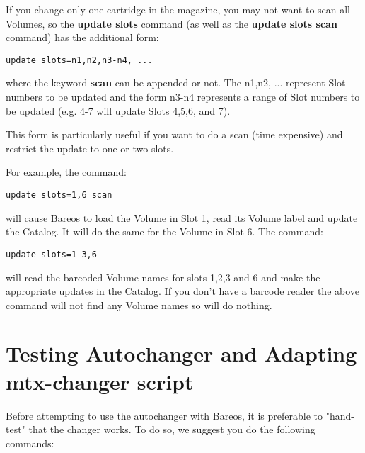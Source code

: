 If you change only one cartridge in the magazine, you may not want to scan all
Volumes, so the {\bf update slots} command (as well as the {\bf update slots
scan} command) has the additional form:

\footnotesize
\begin{verbatim}
update slots=n1,n2,n3-n4, ...
\end{verbatim}
\normalsize

where the keyword {\bf scan} can be appended or not. The n1,n2, ... represent
Slot numbers to be updated and the form n3-n4 represents a range of Slot
numbers to be updated (e.g. 4-7 will update Slots 4,5,6, and 7).

This form is particularly useful if you want to do a scan (time expensive) and
restrict the update to one or two slots.

For example, the command:

\footnotesize
\begin{verbatim}
update slots=1,6 scan
\end{verbatim}
\normalsize

will cause Bareos to load the Volume in Slot 1, read its Volume label and
update the Catalog. It will do the same for the Volume in Slot 6. The command:


\footnotesize
\begin{verbatim}
update slots=1-3,6
\end{verbatim}
\normalsize

will read the barcoded Volume names for slots 1,2,3 and 6 and make the
appropriate updates in the Catalog. If you don't have a barcode reader the above command will
not find any Volume names so will do nothing.


\section{Testing Autochanger and Adapting mtx-changer script}
\label{AutochangerTesting}

Before attempting to use the autochanger with Bareos, it is preferable to
"hand-test" that the changer works. To do so, we suggest you do the
following commands:

